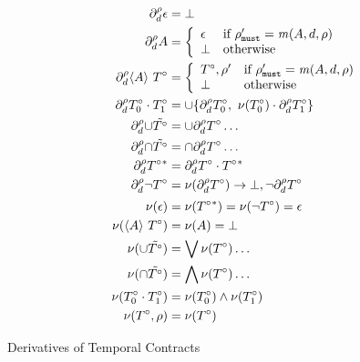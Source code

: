   {\begin{align*}
      \partial_{d}^{\rho}{\epsilon} &= \bot
      \\
      \partial_{d}^{\rho}{A} &= \left\{
        \begin{array}{ll}
          \epsilon & \text{if } \rho'_{\tt must} = \mathit{m}(A, d, \rho) \\
          \bot & \text{otherwise}
        \end{array}\right.
      \\
      \partial_{d}^{\rho}{\langle A\rangle\ T^\circ} &=
      \left\{\begin{array}{ll}
          T^\circ,\rho' & \text{if } \rho'_{\tt must} = \mathit{m}(A, d, \rho) \\
          \bot & \text{otherwise}
        \end{array}\right.
      \\
      \partial_{d}^{\rho}{T^\circ_0 \cdot T^\circ_1} &=
      \cup \{\partial_{d}^{\rho}{T^\circ_0},\
          \nu(T^\circ_0) \cdot \partial_{d}^{\rho}{T^\circ_1}\}
      \\
      \partial_{d}^{\rho}{\cup \tilde{T^\circ}} &=
      \cup \partial_{d}^{\rho}{T^\circ}\ldots
      \\
      \partial_{d}^{\rho}{\cap \tilde{T^\circ}} &=
      \cap \partial_{d}^{\rho}{T^\circ}\ldots
      \\
      \partial_{d}^{\rho}{T^\circ{}^*} &=
      \partial_{d}^{\rho}{T^\circ} \cdot T^\circ{}^*
      \\
      \partial_{d}^{\rho}{\neg T^\circ} &=
      \nu(\partial_{d}^{\rho}{T^\circ}) \to \bot,
      \neg \partial_{d}^{\rho}{T^\circ}
      \\[2pt]
      \nu(\epsilon) &= \nu(T^\circ{}^*) =
      \nu(\neg T^\circ) = \epsilon
      \\
      \nu(\langle A\rangle\ T^\circ) &= \nu(A) = \bot
      \\
      \nu(\cup \tilde{T^\circ}) &=
      \bigvee{\nu(T^\circ)\ldots}
      \\
      \nu(\cap \tilde{T^\circ}) &=
      \bigwedge{\nu(T^\circ)\ldots}
      \\
      \nu(T^\circ_0 \cdot T^\circ_1) &=
      \nu(T^\circ_0)\wedge \nu(T^\circ_1)
      \\
      \nu(T^\circ,\rho) &= \nu(T^\circ)
    \end{align*}}{\caption{Derivatives of Temporal Contracts}\label{fig:tcon-deriv}}

